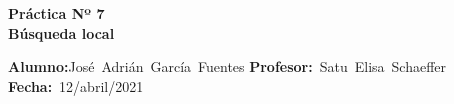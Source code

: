 \documentclass[a4paper]{article}
\begin{document}
\begin{center} %
\large \bf Práctica Nº 7   %
\\ %
Búsqueda local
\end{center} %
\hbox {\textbf{Alumno:}José Adrián García Fuentes}
\hbox {\textbf{Profesor:} Satu Elisa Schaeffer}   %
\hbox {\textbf{Fecha:} 12/abril/2021}        %
\end{document}
